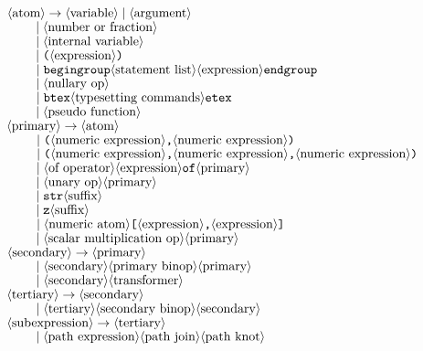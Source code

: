 \begin{figure}[htp]
\begin{ctabbing}
$\tt {\langle\hbox{atom}\rangle} \rightarrow {\langle\hbox{variable}\rangle} \;|\; {\langle\hbox{argument}\rangle}$\\
$\tt \qquad \;|\; {\langle\hbox{number or fraction}\rangle}$\\
$\tt \qquad \;|\; {\langle\hbox{internal variable}\rangle}$\\
$\tt \qquad \;|\; \hbox{\tt (}{\langle\hbox{expression}\rangle}\hbox{\tt )}$\\
$\tt \qquad \;|\; begingroup {\langle\hbox{statement list}\rangle} {\langle\hbox{expression}\rangle} endgroup$\\
$\tt \qquad \;|\; {\langle\hbox{nullary op}\rangle}$\\
$\tt \qquad \;|\; btex {\langle\hbox{typesetting commands}\rangle} etex$\\
$\tt \qquad \;|\; {\langle\hbox{pseudo function}\rangle}$\\
$\tt {\langle\hbox{primary}\rangle} \rightarrow {\langle\hbox{atom}\rangle}$\\
$\tt \qquad \;|\; \hbox{\tt (}{\langle\hbox{numeric expression}\rangle}\hbox{\tt ,} {\langle\hbox{numeric expression}\rangle}\hbox{\tt )}$\\
$\tt \qquad \;|\; \hbox{\tt (}{\langle\hbox{numeric expression}\rangle}\hbox{\tt ,} {\langle\hbox{numeric expression}\rangle}\hbox{\tt ,} {\langle\hbox{numeric expression}\rangle}\hbox{\tt )}$\\
$\tt \qquad \;|\; {\langle\hbox{of operator}\rangle} {\langle\hbox{expression}\rangle} of {\langle\hbox{primary}\rangle}$\\
$\tt \qquad \;|\; {\langle\hbox{unary op}\rangle} {\langle\hbox{primary}\rangle}$\\
$\tt \qquad \;|\; str {\langle\hbox{suffix}\rangle}$\\
$\tt \qquad \;|\; z {\langle\hbox{suffix}\rangle}$\\
$\tt \qquad \;|\; {\langle\hbox{numeric atom}\rangle}\hbox{\tt [}{\langle\hbox{expression}\rangle}\hbox{\tt ,}{\langle\hbox{expression}\rangle}\hbox{\tt ]}$\\
$\tt \qquad \;|\; {\langle\hbox{scalar multiplication op}\rangle} {\langle\hbox{primary}\rangle}$\\
$\tt {\langle\hbox{secondary}\rangle} \rightarrow {\langle\hbox{primary}\rangle}$\\
$\tt \qquad \;|\; {\langle\hbox{secondary}\rangle} {\langle\hbox{primary binop}\rangle} {\langle\hbox{primary}\rangle}$\\
$\tt \qquad \;|\; {\langle\hbox{secondary}\rangle} {\langle\hbox{transformer}\rangle}$\\
$\tt {\langle\hbox{tertiary}\rangle} \rightarrow {\langle\hbox{secondary}\rangle}$\\
$\tt \qquad \;|\; {\langle\hbox{tertiary}\rangle} {\langle\hbox{secondary binop}\rangle} {\langle\hbox{secondary}\rangle}$\\
$\tt {\langle\hbox{subexpression}\rangle} \rightarrow {\langle\hbox{tertiary}\rangle}$\\
$\tt \qquad \;|\; {\langle\hbox{path expression}\rangle} {\langle\hbox{path join}\rangle} {\langle\hbox{path knot}\rangle}$\\

\end{ctabbing}
\end{figure}
